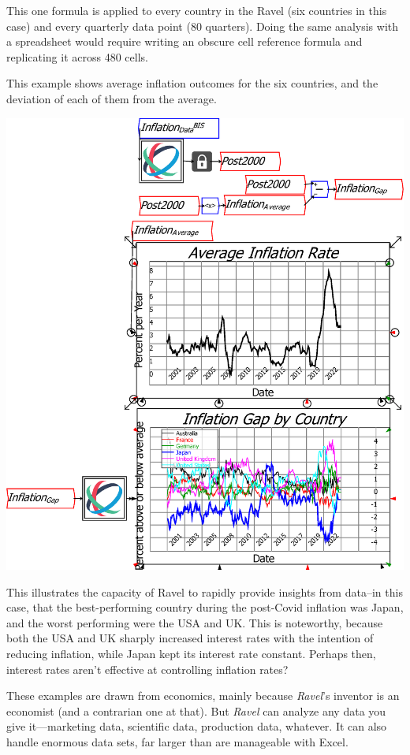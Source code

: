 This one formula is applied to every country in the Ravel (six countries
in this case) and every quarterly data point (80 quarters). Doing
the same analysis with a spreadsheet would require writing an obscure
cell reference formula and replicating it across 480 cells.

This example shows average inflation outcomes for the six countries,
and the deviation of each of them from the average.

\begin{center}
  \includegraphics{images/03RavelDataInflationAnalyzed}
\end{center}

This illustrates the capacity of Ravel to rapidly provide insights
from data--in this case, that the best-performing country during
the post-Covid inflation was Japan, and the worst performing were
the USA and UK. This is noteworthy, because both the USA and UK sharply
increased interest rates with the intention of reducing inflation,
while Japan kept its interest rate constant. Perhaps then, interest
rates aren't effective at controlling inflation rates? 

These examples are drawn from economics, mainly because \emph{Ravel}'s
inventor is an economist (and a contrarian one at that). But \emph{Ravel}
can analyze any data you give it---marketing data, scientific data,
production data, whatever. It can also handle enormous data sets,
far larger than are manageable with Excel.
 
